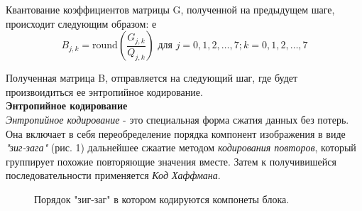 \documentclass{matmex-diploma-custom}
\begin{document}
Квантование коэффициентов матрицы  G, полученной на предыдущем шаге, происходит следующим образом:
е
$$B_{j,k} = \mathrm{round} \left( \frac{G_{j,k}}{Q_{j,k}} \right) \mbox{ для } j=0,1,2,\ldots,7; k=0,1,2,\ldots,7$$


  Полученная матрица B, отправляется на следующий шаг, где будет произвоидиться ее энтропийное кодирование.\\

\textbf{Энтропийное кодирование}\\

\emph{Энтропийное кодирование} - это специальная форма сжатия данных без потерь. Она включает в себя переобределение порядка компонент изображения в виде \emph{"зиг-зага"} (рис. 1) дальнейшее сжаатие методом \emph{кодирования повторов}, который группирует похожие повторяющие значения вместе. Затем к получивишейся последовательности применяется \emph{Код Хаффмана}.\\

    \begin{figure}
      \centering
      \caption{Порядок "зиг-заг" в котором кодируются компонеты блока.}
    \end{figure}
\end{document}
